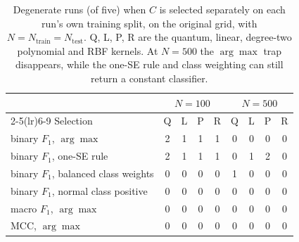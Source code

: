 \begin{table}[t]
\centering
\caption{Degenerate runs (of five) when $C$ is selected separately
on each run's own training split, on the original grid, with
$N = N_{\text{train}} = N_{\text{test}}$. Q, L, P, R
are the quantum, linear, degree-two polynomial and RBF kernels. At
$N = 500$ the $\arg\max$ trap disappears, while the one-SE rule and
class weighting can still return a constant classifier.}
\label{tab:remedies}
\setlength{\tabcolsep}{3.2pt}
\begin{tabular}{lcccccccc}
\toprule
 & \multicolumn{4}{c}{$N = 100$} & \multicolumn{4}{c}{$N = 500$} \\
\cmidrule(lr){2-5}\cmidrule(lr){6-9}
Selection & Q & L & P & R & Q & L & P & R \\
\midrule
binary $F_1$, $\arg\max$ & 2 & 1 & 1 & 1 & 0 & 0 & 0 & 0 \\
binary $F_1$, one-SE rule & 2 & 1 & 1 & 1 & 0 & 1 & 2 & 0 \\
binary $F_1$, balanced class weights & 0 & 0 & 0 & 0 & 1 & 0 & 0 & 0 \\
binary $F_1$, normal class positive & 0 & 0 & 0 & 0 & 0 & 0 & 0 & 0 \\
macro $F_1$, $\arg\max$ & 0 & 0 & 0 & 0 & 0 & 0 & 0 & 0 \\
MCC, $\arg\max$ & 0 & 0 & 0 & 0 & 0 & 0 & 0 & 0 \\
\bottomrule
\end{tabular}
\end{table}
